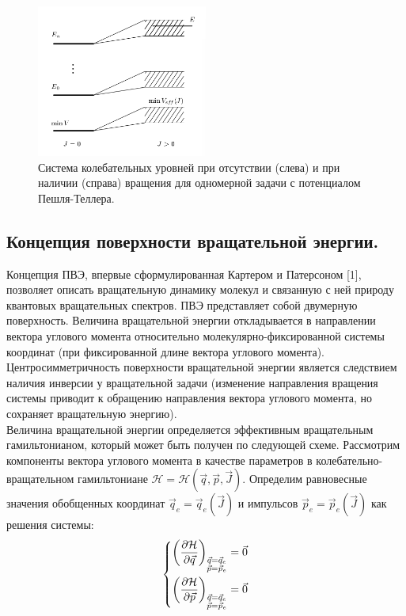 \begin{figure}[H]
  \centering
	\includegraphics[width=0.5\textwidth]{../pictures/VibrationalLevels.png}
	\caption{Система колебательных уровней при отсутствии (слева) и при наличии (справа) вращения для одномерной задачи с потенциалом Пешля-Теллера.}
	\label{fig:vib_levels}
\end{figure}
	
\subsection{Концепция поверхности вращательной энергии.}

Концепция ПВЭ, впервые сформулированная Картером и Патерсоном [1], позволяет описать вращательную динамику молекул и связанную с ней природу квантовых вращательных спектров. ПВЭ представляет собой двумерную поверхность. Величина вращательной энергии откладывается в направлении вектора углового момента относительно молекулярно-фиксированной системы координат (при фиксированной длине вектора углового момента). Центросимметричность поверхности вращательной энергии является следствием наличия инверсии у вращательной задачи (изменение направления вращения системы приводит к обращению направления вектора углового момента, но сохраняет вращательную энергию). \\

Величина вращательной энергии определяется эффективным вращательным гамильтонианом, который может быть получен по следующей схеме. Рассмотрим компоненты вектора углового момента в качестве параметров в колебательно-вращательном гамильтониане $\mathcal{H} = \mathcal{H} (\vec{q}, \vec{p}, \vec{J})$. Определим равновесные значения обобщенных координат $\vec{q}_e = \vec{q}_e (\vec{J})$ и импульсов $\vec{p}_e = \vec{p}_e (\vec{J})$ как решения системы:
\begin{gather}
\left\{
\begin{aligned}
\left( \frac{\partial \mathcal{H}}{\partial \vec{q}} \right)_{\substack{\vec{q} = \vec{q}_e \\ \vec{p} = \vec{p}_e}} = \vec{0} \\
\left( \frac{\partial \mathcal{H}}{\partial \vec{p}} \right)_{\substack{\vec{q} = \vec{q}_e \\ \vec{p} = \vec{p}_e}} = \vec{0}
\end{aligned}
\right. \label{eff_ham}
\end{gather}


